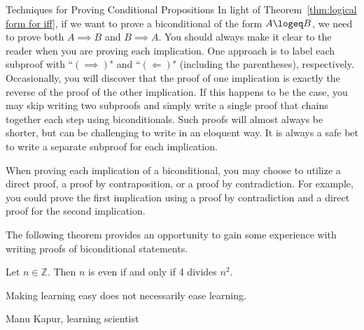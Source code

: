 \begin{section}{Techniques for Proving Conditional Propositions}
In light of Theorem~\ref{thm:logical form for iff}, if we want to prove a biconditional of the form $A\logeq B$, we need to prove both $A\implies B$ and $B\implies A$.  You should always make it clear to the reader when you are proving each implication. One approach is to label each subproof with ``$(\implies)$" and ``$(\Longleftarrow)$" (including the parentheses), respectively.  Occasionally, you will discover that the proof of one implication is exactly the reverse of the proof of the other implication.  If this happens to be the case, you may skip writing two subproofs and simply write a single proof that chains together each step using biconditionals.  Such proofs will almost always be shorter, but can be challenging to write in an eloquent way.  It is always a safe bet to write a separate subproof for each implication.

When proving each implication of a biconditional, you may choose to utilize a direct proof, a proof by contraposition, or a proof by contradiction.  For example, you could prove the first implication using a proof by contradiction and a direct proof for the second implication.

The following theorem provides an opportunity to gain some experience with writing proofs of biconditional statements.

\begin{theorem}
Let $n\in\mathbb{Z}$. Then $n$ is even if and only if 4 divides $n^2$.
\end{theorem} 

\epigraph{Making learning easy does not necessarily ease learning.}{Manu Kapur, learning scientist}

\end{section}